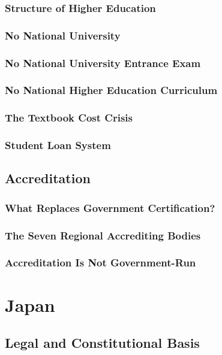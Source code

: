 \subsection{Structure of Higher Education}
\subsection{No National University}
\subsection{No National University Entrance Exam}
\subsection{No National Higher Education Curriculum}
\subsection{The Textbook Cost Crisis}
\subsection{Student Loan System}

\section{Accreditation}
\subsection{What Replaces Government Certification?}
\subsection{The Seven Regional Accrediting Bodies}
\subsection{Accreditation Is Not Government-Run}


\chapter{Japan}

\section{Legal and Constitutional Basis}
